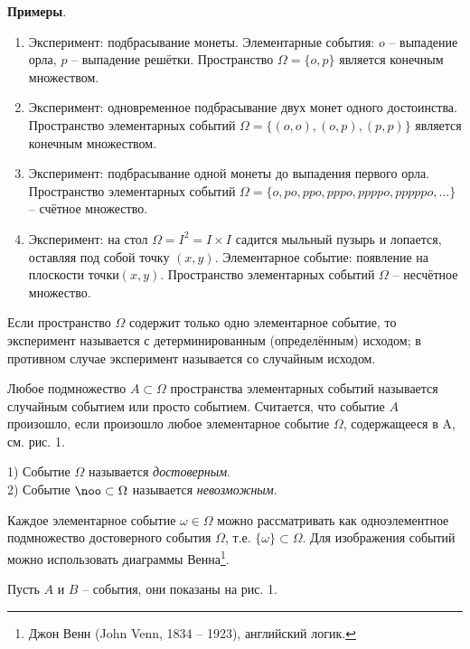 \textbf{Примеры}. 
\begin{enumerate}
	\item Эксперимент: подбрасывание монеты. Элементарные события: $o$ -- выпадение орла, $p$ -- выпадение решётки. Пространство $\Omega=\{o,p\}$ является конечным множеством.
	\item Эксперимент: одновременное подбрасывание двух монет одного достоинства. Пространство элементарных событий $\Omega=\{(o,o),(o,p),(p,p)\}$ является конечным множеством.
	\item Эксперимент: подбрасывание одной монеты до выпадения первого орла. Пространство элементарных событий $\Omega=\{o, po, ppo, pppo, ppppo, pppppo, \ldots\}$ -- счётное множество.
	\item Эксперимент: на стол $\Omega=I^2=I\times I$ садится мыльный пузырь и лопается, оставляя под собой точку $(x, y)$. Элементарное событие: появление на плоскости точки$ (x, y)$. Пространство элементарных событий $\Omega$ -- несчётное
множество.
\end{enumerate}


\begin{definition}
Если пространство $\Omega$ содержит только одно элементарное событие, то эксперимент называется с детерминированным (определённым) исходом; в противном случае эксперимент называется со случайным
исходом.
\end{definition}

\begin{definition} Любое подмножество $A\subset\Omega$ пространства элементарных событий называется случайным событием или просто событием. Считается, что событие $A$ произошло, если произошло любое элементарное событие $\Omega$, содержащееся в A, см. рис. 1.
\end{definition}
\begin{definition}
	1) Событие $\Omega$ называется \textit{достоверным}.\\
	2) Событие $\noo\subset\Omega$ называется \textit{невозможным}.
\end{definition}

Каждое элементарное событие $\omega\in\Omega$ можно рассматривать как одноэлементное подмножество достоверного события $\Omega$, т.е. $\{\omega\}\subset\Omega$. Для изображения событий можно использовать диаграммы Венна\footnote{Джон Венн (John Venn, 1834 -- 1923), английский логик.}.

Пусть $A$ и $B$ -- события, они показаны на рис. 1.

